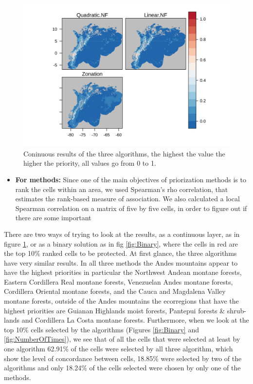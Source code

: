 \documentclass[]{article}
\providecommand{\tightlist}{%
  \setlength{\itemsep}{0pt}\setlength{\parskip}{0pt}}
\begin{document}
\begin{figure}
\centering
\includegraphics{NFPaper_files/figure-latex/AllSols-1.png}
\caption{\label{fig:AllSols}Coninuous results of the three algorithms, the highest the value the higher the priority, all values go from 0 to 1.}
\end{figure}

\begin{itemize}
\tightlist
\item
  \textbf{For methods:} Since one of the main objectives of priorization methods is to rank the cells within an area, we used Spearman's rho correlation, that estimates the rank-based measure of association. We also calculated a local Spearman correlation on a matrix of five by five cells, in order to figure out if there are some important
\end{itemize}

There are two ways of trying to look at the results, as a continuous layer, as in figure \ref{fig:AllSols}, or as a binary solution as in fig \ref{fig:Binary}, where the cells in red are the top 10\% ranked cells to be protected. At first glance, the three algorithms have very similar results. In all three methods the Andes mountains appear to have the highest priorities in particular the Northwest Andean montane forests, Eastern Cordillera Real montane forests, Venezuelan Andes montane forests, Cordillera Oriental montane forests, and the Cauca and Magdalena Valley montane forests, outside of the Andes mountains the ecorregions that have the highest priorities are Guianan Highlands moist forests, Pantepui forests \& shrub-lands and Cordillera La Costa montane forests. Furthermore, when we look at the top 10\% cells selected by the algorithms (Figures \ref{fig:Binary} and \ref{fig:NumberOfTimes}), we see that of all the cells that were selected at least by one algorithm 62.91\% of the cells were selected by all three algorithm, which show the level of concordance between cells, 18.85\% were selected by two of the algorithms and only 18.24\% of the cells selected were chosen by only one of the methods.
\end{document}
